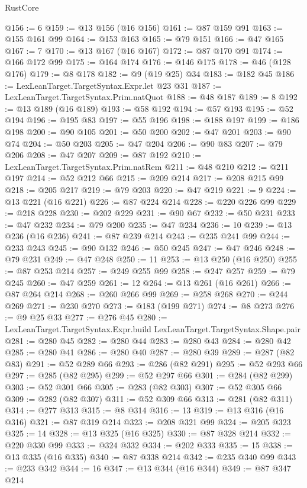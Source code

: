 \begin{lexlean}{RustCore}
\begin{coremodule}
@156 := 6
@159 := @13 @156 (@16 @156)
@161 := @87 @159 @91
@163 := @155 @161 @99
@164 := @153 @163
@165 := @79 @151
@166 := @47 @165
@167 := 7
@170 := @13 @167 (@16 @167)
@172 := @87 @170 @91
@174 := @166 @172 @99
@175 := @164 @174
@176 := @146 @175
@178 := @46 (@128 @176)
@179 := @8 @178
@182 := @9 (@19 @25) @34
@183 := @182 @45
@186 := LexLeanTarget.TargetSyntax.Expr.let @23 @31
@187 := LexLeanTarget.TargetSyntax.Prim.natQuot
@188 := @48 @187
@189 := 8
@192 := @13 @189 (@16 @189)
@193 := @58 @192
@194 := @57 @193
@195 := @52 @194
@196 := @195 @83
@197 := @55 @196
@198 := @188 @197
@199 := @186 @198
@200 := @90 @105
@201 := @50 @200
@202 := @47 @201
@203 := @90 @74
@204 := @50 @203
@205 := @47 @204
@206 := @90 @83
@207 := @79 @206
@208 := @47 @207
@209 := @87 @192
@210 := LexLeanTarget.TargetSyntax.Prim.natRem
@211 := @48 @210
@212 := @211 @197
@214 := @52 @212 @66
@215 := @209 @214
@217 := @208 @215 @99
@218 := @205 @217
@219 := @79 @203
@220 := @47 @219
@221 := 9
@224 := @13 @221 (@16 @221)
@226 := @87 @224 @214
@228 := @220 @226 @99
@229 := @218 @228
@230 := @202 @229
@231 := @90 @67
@232 := @50 @231
@233 := @47 @232
@234 := @79 @200
@235 := @47 @234
@236 := 10
@239 := @13 @236 (@16 @236)
@241 := @87 @239 @214
@243 := @235 @241 @99
@244 := @233 @243
@245 := @90 @132
@246 := @50 @245
@247 := @47 @246
@248 := @79 @231
@249 := @47 @248
@250 := 11
@253 := @13 @250 (@16 @250)
@255 := @87 @253 @214
@257 := @249 @255 @99
@258 := @247 @257
@259 := @79 @245
@260 := @47 @259
@261 := 12
@264 := @13 @261 (@16 @261)
@266 := @87 @264 @214
@268 := @260 @266 @99
@269 := @258 @268
@270 := @244 @269
@271 := @230 @270
@273 := @183 (@199 @271)
@274 := @8 @273
@276 := @9 @25 @33
@277 := @276 @45
@280 := LexLeanTarget.TargetSyntax.Expr.build LexLeanTarget.TargetSyntax.Shape.pair
@281 := @280 @45
@282 := @280 @44
@283 := @280 @43
@284 := @280 @42
@285 := @280 @41
@286 := @280 @40
@287 := @280 @39
@289 := @287 (@82 @83)
@291 := @52 @289 @66
@293 := @286 (@82 @291)
@295 := @52 @293 @66
@297 := @285 (@82 @295)
@299 := @52 @297 @66
@301 := @284 (@82 @299)
@303 := @52 @301 @66
@305 := @283 (@82 @303)
@307 := @52 @305 @66
@309 := @282 (@82 @307)
@311 := @52 @309 @66
@313 := @281 (@82 @311)
@314 := @277 @313
@315 := @8 @314
@316 := 13
@319 := @13 @316 (@16 @316)
@321 := @87 @319 @214
@323 := @208 @321 @99
@324 := @205 @323
@325 := 14
@328 := @13 @325 (@16 @325)
@330 := @87 @328 @214
@332 := @220 @330 @99
@333 := @324 @332
@334 := @202 @333
@335 := 15
@338 := @13 @335 (@16 @335)
@340 := @87 @338 @214
@342 := @235 @340 @99
@343 := @233 @342
@344 := 16
@347 := @13 @344 (@16 @344)
@349 := @87 @347 @214

\end{coremodule}
\end{lexlean}
